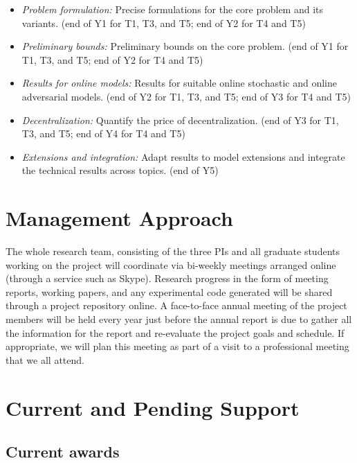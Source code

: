 \begin{itemize}
\item
{\sl Problem formulation:} Precise formulations for the core problem
and its variants.  (end of Y1 for T1, T3, and T5; end of Y2 for T4 and T5)
\item
{\sl Preliminary bounds:} Preliminary bounds on the core problem. (end
of Y1 for T1, T3, and T5; end of Y2 for T4 and T5)
\item
{\sl Results for online models:} Results for suitable online stochastic and
online adversarial models. (end of Y2 for T1, T3, and T5; end of Y3 for T4 and T5)
\item
{\sl Decentralization:} Quantify the price of decentralization.  (end
of Y3 for T1, T3, and T5; end of Y4 for T4 and T5)
\item
{\sl Extensions and integration:} Adapt results to model extensions
and integrate the technical results across topics. (end of Y5)
\end{itemize}

\section{Management Approach}

The whole research team, consisting of the three PIs and all graduate
students working on the project will coordinate via bi-weekly meetings
arranged online (through a service such as Skype). Research progress
in the form of meeting reports, working papers, and any experimental
code generated will be shared through a project repository online. A
face-to-face annual meeting of the project members will be held every
year just before the annual report is due to gather all the
information for the report and re-evaluate the project goals and
schedule.  If appropriate, we will plan this meeting as part of a
visit to a professional meeting that we all attend.

\section{Current and Pending Support}

\subsection{Current awards}

